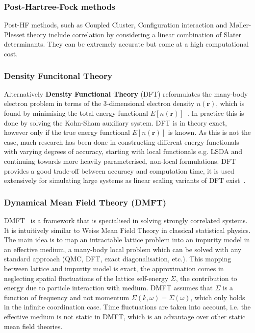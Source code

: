 \subsubsection{Post-Hartree-Fock methods}
Post-HF methods, such as Coupled Cluster, Configuration interaction and M\o ller-Plesset theory include correlation by considering a linear combination of Slater determinants. They can be extremely accurate but come at a high computational cost. 

\subsubsection{Density Funcitonal Theory}
Alternatively \textbf{Density Functional Theory} (DFT) reformulates the many-body electron problem in terms of the $3$-dimensional electron density $n(\mathbf{r})$, which is found by minimising the total energy functional $E[n(\mathbf{r})]$~\cite{hohenberg1964inhomogeneous}. In practice this is done by solving the Kohn-Sham auxiliary system. DFT is in theory exact, however only if the true energy functional $E[n(\mathbf{r})]$ is known. As this is not the case, much research has been done in constructing different energy functionals with varying degrees of accuracy, starting with local functionals e.g. LSDA and continuing towards more heavily parameterised, non-local formulations. DFT provides a good trade-off between accuracy and computation time, it is used extensively for simulating large systems as linear scaling variants of DFT exist~\cite{skylaris2005introducing}. 

\subsubsection{Dynamical Mean Field Theory (DMFT)}
DMFT~\cite{held2007electronic} is a framework that is specialised in solving strongly correlated systems. It is intuitively similar to Weiss Mean Field Theory in classical statistical physics. The main idea is to map an intractable lattice problem into an impurity model in an effective medium, a many-body local problem which can be solved with any standard approach (QMC, DFT, exact diagonalisation, etc.). This mapping between lattice and impurity model is exact, the approximation comes in neglecting spatial fluctuations of the lattice self-energy $\Sigma$, the contribution to energy due to particle interaction with medium. DMFT assumes that $\Sigma$ is a function of frequency and not momentum $\Sigma(k, \omega) = \Sigma(\omega)$, which only holds in the infinite coordination case. Time fluctuations are taken into account, i.e. the effective medium is not static in DMFT, which is an advantage over other static mean field theories. 

